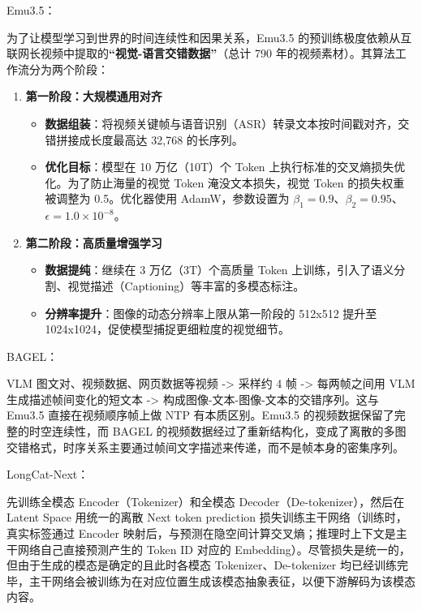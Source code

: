 Emu3.5：

为了让模型学习到世界的时间连续性和因果关系，Emu3.5 的预训练极度依赖从互联网长视频中提取的\textbf{``视觉-语言交错数据''}（总计 790 年的视频素材）。其算法工作流分为两个阶段：

\begin{enumerate}
\def\labelenumi{\arabic{enumi}.}
\tightlist
\item
  \textbf{第一阶段：大规模通用对齐}

  \begin{itemize}
  \tightlist
  \item
    \textbf{数据组装}：将视频关键帧与语音识别（ASR）转录文本按时间戳对齐，交错拼接成长度最高达 32,768 的长序列。
  \item
    \textbf{优化目标}：模型在 10 万亿（10T）个 Token 上执行标准的交叉熵损失优化。为了防止海量的视觉 Token 淹没文本损失，视觉 Token 的损失权重被调整为 0.5。优化器使用 AdamW，参数设置为 \(\beta_1=0.9\)、\(\beta_2=0.95\)、\(\epsilon=1.0\times10^{-8}\)。
  \end{itemize}
\item
  \textbf{第二阶段：高质量增强学习}

  \begin{itemize}
  \tightlist
  \item
    \textbf{数据提纯}：继续在 3 万亿（3T）个高质量 Token 上训练，引入了语义分割、视觉描述（Captioning）等丰富的多模态标注。
  \item
    \textbf{分辨率提升}：图像的动态分辨率上限从第一阶段的 512x512 提升至 1024x1024，促使模型捕捉更细粒度的视觉细节。
  \end{itemize}
\end{enumerate}

BAGEL：

VLM 图文对、视频数据、网页数据等视频 -\textgreater{} 采样约 4 帧 -\textgreater{} 每两帧之间用 VLM 生成描述帧间变化的短文本 -\textgreater{} 构成图像-文本-图像-文本的交错序列。这与 Emu3.5 直接在视频顺序帧上做 NTP 有本质区别。Emu3.5 的视频数据保留了完整的时空连续性，而 BAGEL 的视频数据经过了重新结构化，变成了离散的多图交错格式，时序关系主要通过帧间文字描述来传递，而不是帧本身的密集序列。

LongCat-Next：

先训练全模态 Encoder（Tokenizer）和全模态 Decoder（De-tokenizer），然后在 Latent Space 用统一的离散 Next token prediction 损失训练主干网络（训练时，真实标签通过 Encoder 映射后，与预测在隐空间计算交叉熵；推理时上下文是主干网络自己直接预测产生的 Token ID 对应的 Embedding）。尽管损失是统一的，但由于生成的模态是确定的且此时各模态 Tokenizer、De-tokenizer 均已经训练完毕，主干网络会被训练为在对应位置生成该模态抽象表征，以便下游解码为该模态内容。

